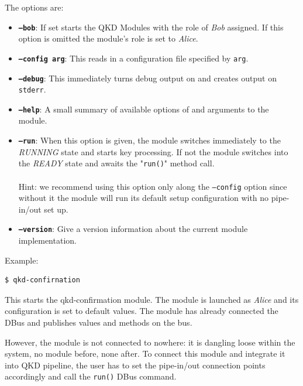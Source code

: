 The options are:

\begin{itemize}

\item{\textbf{\texttt{--bob}}}: If set starts the QKD Modules with the role of \emph{Bob} assigned. If this option is omitted the module's role is set to \emph{Alice}.

\item{\textbf{\texttt{--config arg}}}: This reads in a configuration file specified by \texttt{arg}.

\item{\textbf{\texttt{--debug}}}: This immediately turns debug output on and creates output on \texttt{stderr}.

\item{\textbf{\texttt{--help}}}: A small summary of available options of and arguments to the module.

\item{\textbf{\texttt{--run}}}: When this option is given, the module switches immediately to the \emph{RUNNING} state and starts key processing. If not the module switches into the \emph{READY} state and awaits the "\texttt{run()}" method call. \\ \\
Hint: we recommend using this option only along the \texttt{--config} option since without it the module will run its default setup configuration with no pipe-in/out set up.

\item{\textbf{\texttt{--version}}}: Give a version information about the current module implementation.

\end{itemize}

\clearpage

\noindent Example:

\begin{minipage}{0.9\textwidth}
\bigskip
\begin{verbatim}
$ qkd-confirnation
\end{verbatim}
\medskip
\end{minipage}

This starts the qkd-confirmation module. The module is launched as \emph{Alice} and its configuration is set to default values. The module has already connected the DBus and publishes values and methods on the bus.

\medskip

However, the module is not connected to nowhere: it is dangling loose within the system, no module before, none after. To connect this module and integrate it into QKD pipeline, the user has to set the pipe-in/out connection points accordingly and call the \texttt{run()} DBus command.

